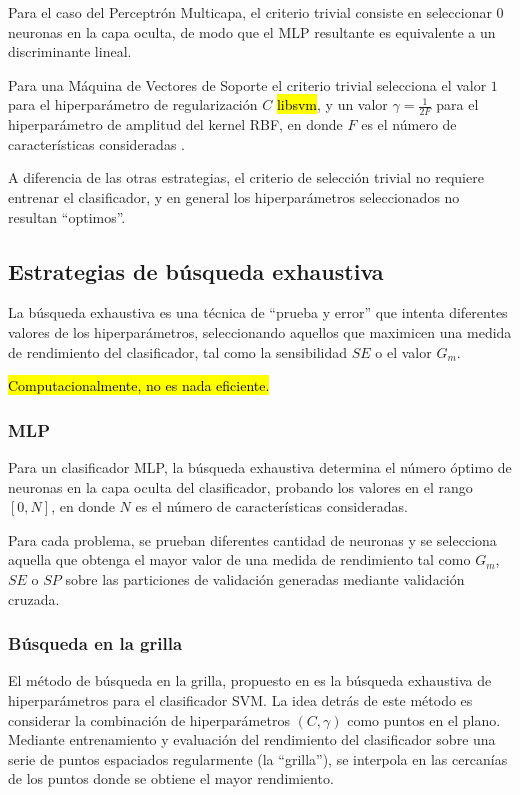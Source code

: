 \documentclass[12pt,bibliography=oldstyle,DIV=12,parskip=half-]{scrreprt}
\begin{document}
Para el caso del Perceptrón Multicapa, el criterio trivial consiste en
seleccionar $0$ neuronas en la capa oculta, de modo que el MLP
resultante es equivalente a un discriminante lineal.

Para una Máquina de Vectores de Soporte el criterio trivial selecciona
el valor $1$ para el hiperparámetro de regularización $C$
\hl{libsvm}, y un valor $\gamma=\frac{1}{2F}$ para el
hiperparámetro de amplitud del kernel RBF, en donde $F$ es el número
de características consideradas \cite{glasmachersigel, libsvm}.

A diferencia de las otras estrategias, el criterio de selección
trivial no requiere entrenar el clasificador, y en general los
hiperparámetros seleccionados no resultan ``optimos''.
%
%
\subsection{Estrategias de búsqueda exhaustiva}
%
La búsqueda exhaustiva es una técnica de ``prueba y error'' que
intenta diferentes valores de los hiperparámetros, seleccionando
aquellos que maximicen una medida de rendimiento del clasificador, tal
como la sensibilidad $SE$ o el valor $G_m$.

\hl{Computacionalmente, no es nada eficiente.}
%
\subsubsection{MLP}
%
Para un clasificador MLP, la búsqueda exhaustiva determina el número
óptimo de neuronas en la capa oculta del clasificador, probando los
valores en el rango $[0,N]$, en donde $N$ es el número de
características consideradas.

Para cada problema, se prueban diferentes cantidad de neuronas y se
selecciona aquella que obtenga el mayor valor de una medida de
rendimiento tal como $G_m$, $SE$ o $SP$ sobre las particiones de
validación generadas mediante validación cruzada.
%
\subsubsection{Búsqueda en la grilla}
%
El método de búsqueda en la grilla, propuesto en \cite{hsu} es la
búsqueda exhaustiva de hiperparámetros para el clasificador SVM. La
idea detrás de este método es considerar la combinación de
hiperparámetros $(C,\gamma)$ como puntos en el plano. Mediante
entrenamiento y evaluación del rendimiento del clasificador sobre una
serie de puntos espaciados regularmente (la ``grilla''), se interpola
en las cercanías de los puntos donde se obtiene el mayor rendimiento.
\end{document}
